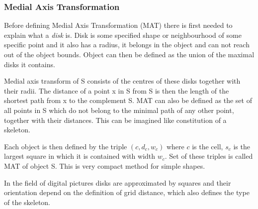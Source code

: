 \subsubsection{Medial Axis Transformation}
Before defining Medial Axis Transformation (MAT) there is first needed to explain what a \textit{disk} is.
Disk is some specified shape or neighbourhood of some specific point and it also has a radius, it belongs in the object and can not reach out of the object bounds. Object can then be defined as the union of the maximal disks it contains.

Medial axis transform of S consists of the centres of these disks together with their radii. The distance of a point x in S from S is then the length of the shortest path from x to the complement S. MAT can also be defined as the set of all points in S which do not belong to the minimal path of any other point, together with their distances. This can be imagined like constitution of a skeleton.

Each object is then defined by the triple $(c, d_c, w_c)$ where $c$ is the cell, $s_c$ is the largest square in which it is contained with width $w_c$. Set of these triples is called MAT of object S. This is very compact method for simple shapes.

In the field of digital pictures disks are approximated by squares and their orientation depend on the definition of grid distance, which also defines the type of the skeleton.

